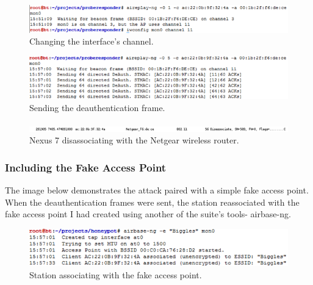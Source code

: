 \begin{figure}[h!]
\includegraphics[width=\linewidth]{research/attackvectors/figures/ddos-2.png}
\caption{Changing the interface's channel.}
\end{figure}

\begin{figure}[h!]
\includegraphics[width=\linewidth]{research/attackvectors/figures/ddos-3.png}
\caption{Sending the deauthentication frame.}
\end{figure}

\begin{figure}[h!]
\includegraphics[width=\linewidth]{research/attackvectors/figures/ddos-4.png}
\caption{Nexus 7 disassociating with the Netgear wireless router.}
\end{figure}

\subsubsection*{Including the Fake Access Point}
The image below demonstrates the attack paired with a simple fake access point. When the deauthentication frames were sent, the station reassociated with the fake access point I had created using another of the suite’s tools- airbase-ng.

\begin{figure}[h!]
\includegraphics[width=\linewidth]{research/attackvectors/figures/ddos-5.png}
\caption{Station associating with the fake access point.}
\end{figure}